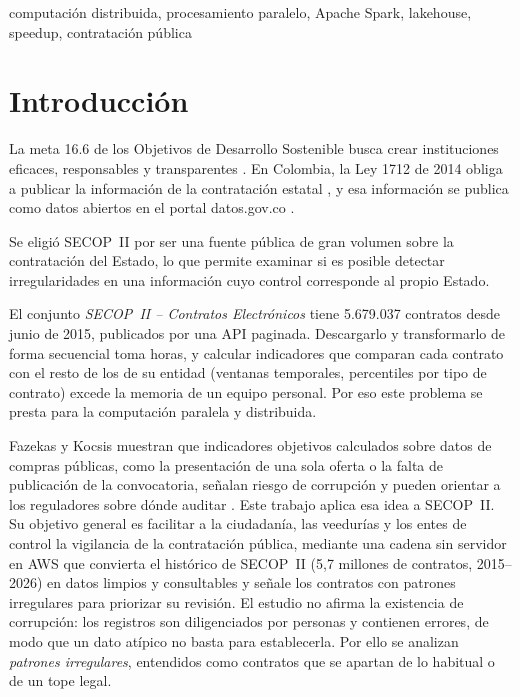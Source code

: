 \documentclass[conference]{IEEEtran}
\begin{document}
\begin{IEEEkeywords}
computación distribuida, procesamiento paralelo, Apache Spark, lakehouse, speedup, contratación pública
\end{IEEEkeywords}

\section{Introducción}
La meta 16.6 de los Objetivos de Desarrollo Sostenible busca crear instituciones eficaces, responsables y transparentes \cite{onu_ods16}. En Colombia, la Ley 1712 de 2014 obliga a publicar la información de la contratación estatal \cite{ley1712}, y esa información se publica como datos abiertos en el portal datos.gov.co \cite{secop_dataset}.

Se eligió SECOP~II por ser una fuente pública de gran volumen sobre la contratación del Estado, lo que permite examinar si es posible detectar irregularidades en una información cuyo control corresponde al propio Estado.

El conjunto \emph{SECOP~II -- Contratos Electrónicos} tiene 5.679.037 contratos desde junio de 2015, publicados por una API paginada. Descargarlo y transformarlo de forma secuencial toma horas, y calcular indicadores que comparan cada contrato con el resto de los de su entidad (ventanas temporales, percentiles por tipo de contrato) excede la memoria de un equipo personal. Por eso este problema se presta para la computación paralela y distribuida.

Fazekas y Kocsis muestran que indicadores objetivos calculados sobre datos de compras públicas, como la presentación de una sola oferta o la falta de publicación de la convocatoria, señalan riesgo de corrupción y pueden orientar a los reguladores sobre dónde auditar \cite{fazekas2020}. Este trabajo aplica esa idea a SECOP~II. Su objetivo general es facilitar a la ciudadanía, las veedurías y los entes de control la vigilancia de la contratación pública, mediante una cadena sin servidor en AWS que convierta el histórico de SECOP~II (5,7 millones de contratos, 2015--2026) en datos limpios y consultables y señale los contratos con patrones irregulares para priorizar su revisión. El estudio no afirma la existencia de corrupción: los registros son diligenciados por personas y contienen errores, de modo que un dato atípico no basta para establecerla. Por ello se analizan \emph{patrones irregulares}, entendidos como contratos que se apartan de lo habitual o de un tope legal.
\end{document}
